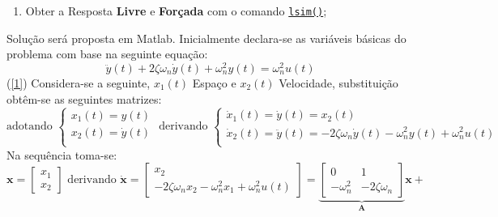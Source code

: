 \documentclass{article}
\begin{document}
\begin{exercise}
\begin{enumerate}
            \item\label{5} Obter a Resposta \textbf{Livre} e \textbf{Forçada} com o comando \href{https://www.mathworks.com/help/control/ref/lti.lsim.html}{\texttt{lsim()}};
        \end{enumerate}
    \end{exercise}
\newpage
    \begin{resolution}
    Solução será proposta em Matlab. Inicialmente declara-se as variáveis básicas do problema com base na seguinte equação:
    \begin{equation*}
        \ddot{y}(t) + 2\zeta\omega_{n}\dot{y}(t) + \omega_{n}^{2} y(t) = \omega_{n}^{2} u(t)
    \end{equation*}
    (\ref{1}) Considera-se a seguinte, $x_1(t)$ Espaço e $x_2(t)$ Velocidade, substituição obtêm-se as seguintes matrizes:
    \begin{equation*}
        \text{adotando }\begin{cases}
            x_1(t) = y(t)\\
            x_2(t) = \dot{y}(t)\\
        \end{cases}
        \text{ derivando }\begin{cases}
            \dot{x}_1(t) =  \dot{y}(t) = x_2(t)\\
            \dot{x}_2(t) = \ddot{y}(t) = -2\zeta\omega_{n}\dot{y}(t) - \omega_{n}^{2} y(t) + \omega_{n}^{2} u(t)\\
        \end{cases}
    \end{equation*}
    Na sequência toma-se:
    \begin{equation*}
        \boldsymbol{x} = 
        \begin{bmatrix}
            x_1\\
            x_2
        \end{bmatrix}
        \text{ derivando }
        \dot{\boldsymbol{x}} = 
        \begin{bmatrix}
            x_2\\
            -2\zeta\omega_{n}x_2 - \omega_{n}^{2} x_1 + \omega_{n}^{2} u(t)
        \end{bmatrix} = 
        \underbrace{
        \begin{bmatrix}
            0               & 1\\
            -\omega_{n}^{2} & -2\zeta\omega_{n}
        \end{bmatrix}
        }_{\boldsymbol{A}}
        \boldsymbol{x} + 

\end{equation*}
\end{resolution}
\end{document}
